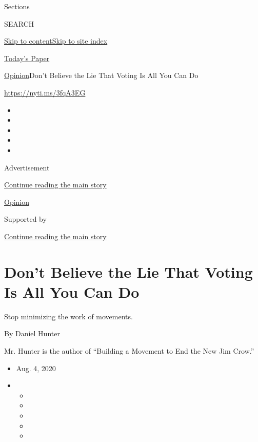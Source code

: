 Sections

SEARCH

\protect\hyperlink{site-content}{Skip to
content}\protect\hyperlink{site-index}{Skip to site index}

\href{https://myaccount.nytimes3xbfgragh.onion/auth/login?response_type=cookie\&client_id=vi}{}

\href{https://www.nytimes3xbfgragh.onion/section/todayspaper}{Today's
Paper}

\href{/section/opinion}{Opinion}\textbar{}Don't Believe the Lie That
Voting Is All You Can Do

\url{https://nyti.ms/3fqA3EG}

\begin{itemize}
\item
\item
\item
\item
\item
\end{itemize}

Advertisement

\protect\hyperlink{after-top}{Continue reading the main story}

\href{/section/opinion}{Opinion}

Supported by

\protect\hyperlink{after-sponsor}{Continue reading the main story}

\hypertarget{dont-believe-the-lie-that-voting-is-all-you-can-do}{%
\section{Don't Believe the Lie That Voting Is All You Can
Do}\label{dont-believe-the-lie-that-voting-is-all-you-can-do}}

Stop minimizing the work of movements.

By Daniel Hunter

Mr. Hunter is the author of ``Building a Movement to End the New Jim
Crow.''

\begin{itemize}
\item
  Aug. 4, 2020
\item
  \begin{itemize}
  \item
  \item
  \item
  \item
  \item
  \end{itemize}
\end{itemize}

